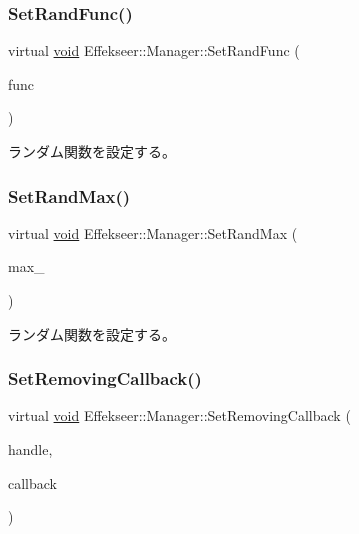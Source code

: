 \subsubsection{\texorpdfstring{Set\+Rand\+Func()}{SetRandFunc()}}
{\footnotesize\ttfamily virtual \mbox{\hyperlink{namespace_effekseer_ab34c4088e512200cf4c2716f168deb56}{void}} Effekseer\+::\+Manager\+::\+Set\+Rand\+Func (\begin{DoxyParamCaption}\item[{Rand\+Func}]{func }\end{DoxyParamCaption})\hspace{0.3cm}{\ttfamily [pure virtual]}}



ランダム関数を設定する。 

\mbox{\label{class_effekseer_1_1_manager_ad2e4e1458d5e1091f5cb8073ae8e60eb}} 
\subsubsection{\texorpdfstring{Set\+Rand\+Max()}{SetRandMax()}}
{\footnotesize\ttfamily virtual \mbox{\hyperlink{namespace_effekseer_ab34c4088e512200cf4c2716f168deb56}{void}} Effekseer\+::\+Manager\+::\+Set\+Rand\+Max (\begin{DoxyParamCaption}\item[{\mbox{\hyperlink{namespace_effekseer_ace0abf7c2e6947e519ebe8b54cbcc30a}{int}}}]{max\+\_\+ }\end{DoxyParamCaption})\hspace{0.3cm}{\ttfamily [pure virtual]}}



ランダム関数を設定する。 

\mbox{\label{class_effekseer_1_1_manager_a62c24747994008dfcb84a0adcd53b3ad}} 
\subsubsection{\texorpdfstring{Set\+Removing\+Callback()}{SetRemovingCallback()}}
{\footnotesize\ttfamily virtual \mbox{\hyperlink{namespace_effekseer_ab34c4088e512200cf4c2716f168deb56}{void}} Effekseer\+::\+Manager\+::\+Set\+Removing\+Callback (\begin{DoxyParamCaption}\item[{\mbox{\hyperlink{namespace_effekseer_afba58b8d812da862190e9bbfc040824a}{Handle}}}]{handle,  }\item[{Effect\+Instance\+Removing\+Callback}]{callback }\end{DoxyParamCaption})\hspace{0.3cm}{\ttfamily [pure virtual]}}



